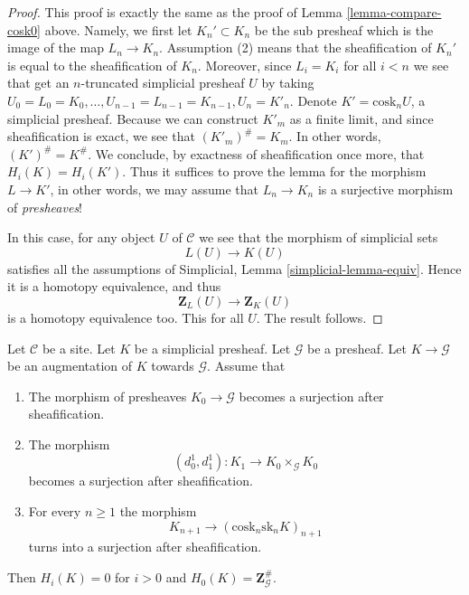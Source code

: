\begin{proof}
This proof is exactly the same as the proof of
Lemma \ref{lemma-compare-cosk0} above. Namely,
we first let $K_n' \subset K_n$ be the sub presheaf
which is the image of the map $L_n \to K_n$. Assumption
(2) means that the sheafification of $K_n'$ is equal to
the sheafification of $K_n$. Moreover, since $L_i = K_i$
for all $i < n$ we see that get an $n$-truncated
simplicial presheaf $U$ by taking
$U_0 = L_0 = K_0, \ldots, U_{n - 1} = L_{n - 1} = K_{n - 1}, U_n = K'_n$.
Denote $K' = \text{cosk}_n U$, a simplicial presheaf.
Because we can construct $K'_m$ as a finite limit, and
since sheafification is exact, we see that
$(K'_m)^\# = K_m$. In other words, $(K')^\# = K^\#$.
We conclude, by exactness of sheafification once more,
that $H_i(K) = H_i(K')$. Thus it suffices to prove the lemma
for the morphism $L \to K'$, in other words, we may
assume that $L_n \to K_n$ is a surjective morphism
of {\it presheaves}!

\medskip\noindent
In this case, for any object $U$ of $\mathcal{C}$ we
see that the morphism of simplicial sets
$$
L(U) \longrightarrow K(U)
$$
satisfies all the assumptions of
Simplicial, Lemma \ref{simplicial-lemma-equiv}.
Hence it is a homotopy equivalence, and
thus
$$
\mathbf{Z}_L(U) \longrightarrow \mathbf{Z}_K(U)
$$
is a homotopy equivalence too. This for all $U$.
The result follows.
\end{proof}

\begin{lemma}
\label{lemma-acyclic-hypercover-sheaves}
Let $\mathcal{C}$ be a site.
Let $K$ be a simplicial presheaf.
Let $\mathcal{G}$ be a presheaf.
Let $K \to \mathcal{G}$ be an augmentation of $K$
towards $\mathcal{G}$. Assume that
\begin{enumerate}
\item The morphism of presheaves $K_0 \to \mathcal{G}$ becomes
a surjection after sheafification.
\item The morphism
$$
(d^1_0, d^1_1) :
K_1
\longrightarrow
K_0 \times_\mathcal{G} K_0
$$
becomes a surjection after sheafification.
\item For every $n \geq 1$ the morphism
$$
K_{n + 1} \longrightarrow (\text{cosk}_n \text{sk}_n K)_{n + 1}
$$
turns into a surjection after sheafification.
\end{enumerate}
Then $H_i(K) = 0$ for $i > 0$ and
$H_0(K) = \mathbf{Z}_\mathcal{G}^\#$.
\end{lemma}

